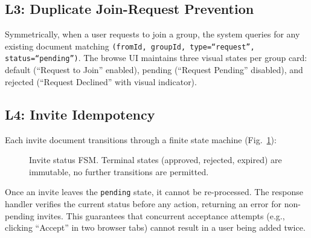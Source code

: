 \documentclass[11pt,a4paper]{article}
\theoremstyle{plain}
\theoremstyle{definition}
\theoremstyle{remark}
\begin{document}
\subsection{L3: Duplicate Join-Request Prevention}

Symmetrically, when a user requests to join a group, the system queries for any existing document matching \texttt{(fromId, groupId, type=``request'', status=``pending'')}. The browse UI maintains three visual states per group card: default (``Request to Join'' enabled), pending (``Request Pending'' disabled), and rejected (``Request Declined'' with visual indicator).

\subsection{L4: Invite Idempotency}

Each invite document transitions through a finite state machine (Fig.~\ref{fig:invitefsm}):

\begin{figure}[htbp]
\centering
{}
\caption{Invite status FSM. Terminal states (approved, rejected, expired) are immutable, no further transitions are permitted.}
\label{fig:invitefsm}
\end{figure}

Once an invite leaves the \texttt{pending} state, it cannot be re-processed. The response handler verifies the current status before any action, returning an error for non-pending invites. This guarantees that concurrent acceptance attempts (e.g., clicking ``Accept'' in two browser tabs) cannot result in a user being added twice.
\end{document}
